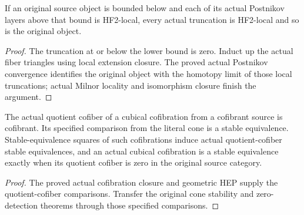 \begin{proposition}
  \label{prop:actual-postnikov-locality-from-layers}
  \leanok
  If an original source object is bounded below and each of its actual Postnikov layers above that bound is HF2-local, every actual truncation is HF2-local and so is the original object.
\end{proposition}
\begin{proof}
  The truncation at or below the lower bound is zero. Induct up the actual fiber triangles using local extension closure. The proved actual Postnikov convergence identifies the original object with the homotopy limit of those local truncations; actual Milnor locality and isomorphism closure finish the argument.
  \leanok
\end{proof}

\begin{proposition}
  \label{prop:actual-cubical-quotient-cofiber-stability}
  \leanok
  The actual quotient cofiber of a cubical cofibration from a cofibrant source is cofibrant. Its specified comparison from the literal cone is a stable equivalence. Stable-equivalence squares of such cofibrations induce actual quotient-cofiber stable equivalences, and an actual cubical cofibration is a stable equivalence exactly when its quotient cofiber is zero in the original source category.
\end{proposition}
\begin{proof}
  The proved actual cofibration closure and geometric HEP supply the quotient-cofiber comparisons. Transfer the original cone stability and zero-detection theorems through those specified comparisons.
  \leanok
\end{proof}

